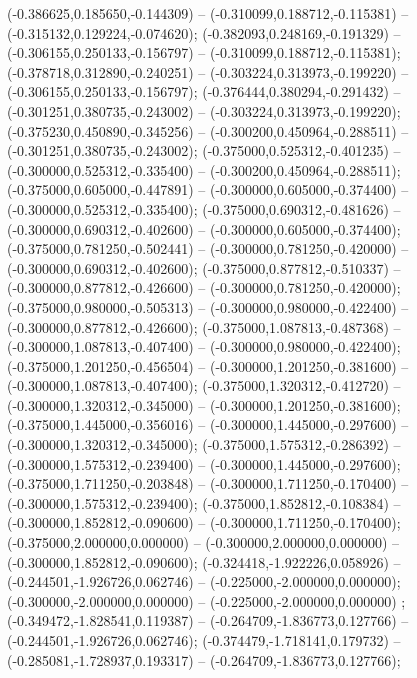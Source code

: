  (-0.386625,0.185650,-0.144309) -- (-0.310099,0.188712,-0.115381) -- (-0.315132,0.129224,-0.074620);
 (-0.382093,0.248169,-0.191329) -- (-0.306155,0.250133,-0.156797) -- (-0.310099,0.188712,-0.115381);
 (-0.378718,0.312890,-0.240251) -- (-0.303224,0.313973,-0.199220) -- (-0.306155,0.250133,-0.156797);
 (-0.376444,0.380294,-0.291432) -- (-0.301251,0.380735,-0.243002) -- (-0.303224,0.313973,-0.199220);
 (-0.375230,0.450890,-0.345256) -- (-0.300200,0.450964,-0.288511) -- (-0.301251,0.380735,-0.243002);
 (-0.375000,0.525312,-0.401235) -- (-0.300000,0.525312,-0.335400) -- (-0.300200,0.450964,-0.288511);
 (-0.375000,0.605000,-0.447891) -- (-0.300000,0.605000,-0.374400) -- (-0.300000,0.525312,-0.335400);
 (-0.375000,0.690312,-0.481626) -- (-0.300000,0.690312,-0.402600) -- (-0.300000,0.605000,-0.374400);
 (-0.375000,0.781250,-0.502441) -- (-0.300000,0.781250,-0.420000) -- (-0.300000,0.690312,-0.402600);
 (-0.375000,0.877812,-0.510337) -- (-0.300000,0.877812,-0.426600) -- (-0.300000,0.781250,-0.420000);
 (-0.375000,0.980000,-0.505313) -- (-0.300000,0.980000,-0.422400) -- (-0.300000,0.877812,-0.426600);
 (-0.375000,1.087813,-0.487368) -- (-0.300000,1.087813,-0.407400) -- (-0.300000,0.980000,-0.422400);
 (-0.375000,1.201250,-0.456504) -- (-0.300000,1.201250,-0.381600) -- (-0.300000,1.087813,-0.407400);
 (-0.375000,1.320312,-0.412720) -- (-0.300000,1.320312,-0.345000) -- (-0.300000,1.201250,-0.381600);
 (-0.375000,1.445000,-0.356016) -- (-0.300000,1.445000,-0.297600) -- (-0.300000,1.320312,-0.345000);
 (-0.375000,1.575312,-0.286392) -- (-0.300000,1.575312,-0.239400) -- (-0.300000,1.445000,-0.297600);
 (-0.375000,1.711250,-0.203848) -- (-0.300000,1.711250,-0.170400) -- (-0.300000,1.575312,-0.239400);
 (-0.375000,1.852812,-0.108384) -- (-0.300000,1.852812,-0.090600) -- (-0.300000,1.711250,-0.170400);
 (-0.375000,2.000000,0.000000) -- (-0.300000,2.000000,0.000000) -- (-0.300000,1.852812,-0.090600);
 (-0.324418,-1.922226,0.058926) -- (-0.244501,-1.926726,0.062746) -- (-0.225000,-2.000000,0.000000);
 (-0.300000,-2.000000,0.000000) -- (-0.225000,-2.000000,0.000000) ;
 (-0.349472,-1.828541,0.119387) -- (-0.264709,-1.836773,0.127766) -- (-0.244501,-1.926726,0.062746);
 (-0.374479,-1.718141,0.179732) -- (-0.285081,-1.728937,0.193317) -- (-0.264709,-1.836773,0.127766);
